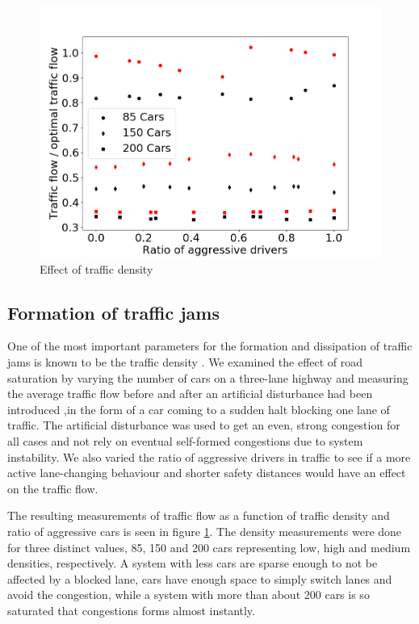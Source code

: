 \documentclass[11pt,a4paper,twocolumn]{article}
\begin{document}
\begin{figure}[ht]     
      \centering
       \includegraphics[scale=0.33]{figs/traffic_density_effect}
       \caption{Effect of traffic density }
       \label{fig:traffic_density}
 \end{figure}
 
 \subsection{Formation of traffic jams}
 One of the most important parameters for the formation and dissipation of traffic jams is known to be the traffic density \cite{kerner96trafficjam, kerner97flow}. We examined the effect of road saturation by varying the number of cars on a three-lane highway and measuring the average traffic flow  before and after an artificial disturbance had been introduced ,in the form of a car coming to a sudden halt blocking one lane of traffic. The artificial disturbance was used to get an even, strong congestion for all cases and not rely on eventual self-formed congestions due to system instability.  We also varied the ratio of aggressive drivers in traffic to see if a more active lane-changing behaviour and shorter safety distances would have an effect on the traffic flow.
 
 The resulting measurements of traffic flow as a function of traffic density and ratio of aggressive cars is seen in figure \ref{fig:traffic_density}. The density measurements were done for three distinct values, 85, 150 and 200 cars representing low, high and medium densities, respectively. A system with less cars are sparse enough to not be affected by a blocked lane, cars have enough space to simply switch lanes and avoid the congestion, while a system with more than about 200 cars is so saturated that congestions forms almost instantly.
 
\end{document}
